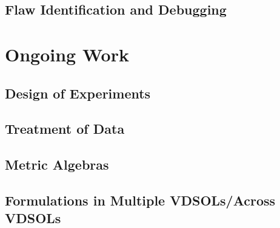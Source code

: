 \documentclass[12pt]{galois-whitepaper}
\begin{document}
\subsection{Flaw Identification and Debugging}

\section{Ongoing Work}

\subsection{Design of Experiments}

\subsection{Treatment of Data}

\subsection{Metric Algebras}

\subsection{Formulations in Multiple VDSOLs/Across VDSOLs}
\end{document}
